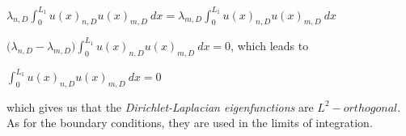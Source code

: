 \documentclass[executivepaper]{article}
\begin{document}
\begin{flushleft}
\begin{center}
\vspace{2mm}

$\lambda_{n,D} \int_{0}^{L_{1}} u(x)_{n,D} u(x)_{m,D} \ dx=\lambda_{m,D} \int_{0}^{L_{1}} u(x)_{n,D} u(x)_{m,D} \ dx$

\vspace{2mm}

$\bigg(\lambda_{n,D}-\lambda_{m,D}\bigg) \int_{0}^{L_{1}} u(x)_{n,D} u(x)_{m,D} \ dx=0$, which leads to

\vspace{2mm}

$\int_{0}^{L_{1}} u(x)_{n,D} u(x)_{m,D} \ dx=0$

\end{center}

which gives us that the \textit{Dirichlet-Laplacian eigenfunctions} are $L^2-orthogonal$. As for the boundary conditions, they are used in the limits of integration.

\end{flushleft}
\end{document}
